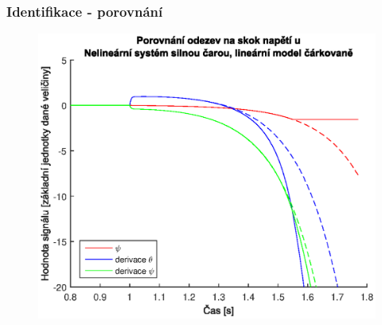\documentclass{beamer}
\begin{document}
    \begin{frame}
        
        \frametitle{Identifikace - porovnání}
    
        \begin{figure}[htbp]
            \centerline{\includegraphics[width=\linewidth]{porovnani_skok.eps}}
            \label{fig:porovnani_skok}        
        \end{figure}
    
    \end{frame}
\end{document}
